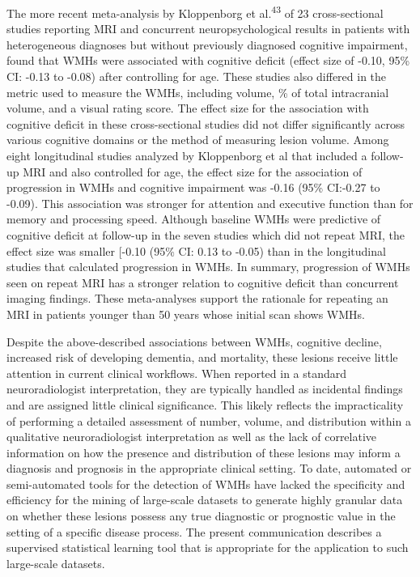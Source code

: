 \documentclass[11pt,]{article}
\begin{document}
The more recent meta-analysis by Kloppenborg et al.\textsuperscript{43}
of 23 cross-sectional studies reporting MRI and concurrent
neuropsychological results in patients with heterogeneous diagnoses but
without previously diagnosed cognitive impairment, found that WMHs were
associated with cognitive deficit (effect size of -0.10, 95\% CI: -0.13
to -0.08) after controlling for age. These studies also differed in the
metric used to measure the WMHs, including volume, \% of total
intracranial volume, and a visual rating score. The effect size for the
association with cognitive deficit in these cross-sectional studies did
not differ significantly across various cognitive domains or the method
of measuring lesion volume. Among eight longitudinal studies analyzed by
Kloppenborg et al that included a follow-up MRI and also controlled for
age, the effect size for the association of progression in WMHs and
cognitive impairment was -0.16 (95\% CI:-0.27 to -0.09). This
association was stronger for attention and executive function than for
memory and processing speed. Although baseline WMHs were predictive of
cognitive deficit at follow-up in the seven studies which did not repeat
MRI, the effect size was smaller {[}-0.10 (95\% CI: 0.13 to -0.05) than
in the longitudinal studies that calculated progression in WMHs. In
summary, progression of WMHs seen on repeat MRI has a stronger relation
to cognitive deficit than concurrent imaging findings. These
meta-analyses support the rationale for repeating an MRI in patients
younger than 50 years whose initial scan shows WMHs.

Despite the above-described associations between WMHs, cognitive
decline, increased risk of developing dementia, and mortality, these
lesions receive little attention in current clinical workflows. When
reported in a standard neuroradiologist interpretation, they are
typically handled as incidental findings and are assigned little
clinical significance. This likely reflects the impracticality of
performing a detailed assessment of number, volume, and distribution
within a qualitative neuroradiologist interpretation as well as the lack
of correlative information on how the presence and distribution of these
lesions may inform a diagnosis and prognosis in the appropriate clinical
setting. To date, automated or semi-automated tools for the detection of
WMHs have lacked the specificity and efficiency for the mining of
large-scale datasets to generate highly granular data on whether these
lesions possess any true diagnostic or prognostic value in the setting
of a specific disease process. The present communication describes a
supervised statistical learning tool that is appropriate for the
application to such large-scale datasets.
\end{document}
